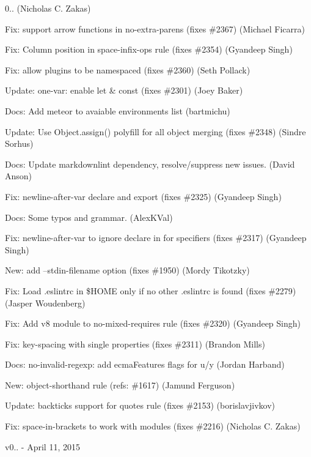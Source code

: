 \begin{DoxyItemize}
\item 0.. (Nicholas C. Zakas)
\item Fix\+: support arrow functions in no-\/extra-\/parens (fixes \#2367) (Michael Ficarra)
\item Fix\+: Column position in space-\/infix-\/ops rule (fixes \#2354) (Gyandeep Singh)
\item Fix\+: allow plugins to be namespaced (fixes \#2360) (Seth Pollack)
\item Update\+: one-\/var\+: enable let \& const (fixes \#2301) (Joey Baker)
\item Docs\+: Add meteor to avaiable environments list (bartmichu)
\item Update\+: Use {\ttfamily Object.\+assign()} polyfill for all object merging (fixes \#2348) (Sindre Sorhus)
\item Docs\+: Update markdownlint dependency, resolve/suppress new issues. (David Anson)
\item Fix\+: newline-\/after-\/var declare and export (fixes \#2325) (Gyandeep Singh)
\item Docs\+: Some typos and grammar. (Alex\+K\+Val)
\item Fix\+: newline-\/after-\/var to ignore declare in for specifiers (fixes \#2317) (Gyandeep Singh)
\item New\+: add --stdin-\/filename option (fixes \#1950) (Mordy Tikotzky)
\item Fix\+: Load .eslintrc in \$\+H\+O\+ME only if no other .eslintrc is found (fixes \#2279) (Jasper Woudenberg)
\item Fix\+: Add {\ttfamily v8} module to no-\/mixed-\/requires rule (fixes \#2320) (Gyandeep Singh)
\item Fix\+: key-\/spacing with single properties (fixes \#2311) (Brandon Mills)
\item Docs\+: {\ttfamily no-\/invalid-\/regexp}\+: add {\ttfamily ecma\+Features} flags for {\ttfamily u}/{\ttfamily y} (Jordan Harband)
\item New\+: object-\/shorthand rule (refs\+: \#1617) (Jamund Ferguson)
\item Update\+: backticks support for quotes rule (fixes \#2153) (borislavjivkov)
\item Fix\+: space-\/in-\/brackets to work with modules (fixes \#2216) (Nicholas C. Zakas)
\end{DoxyItemize}

v0.. -\/ April 11, 2015


